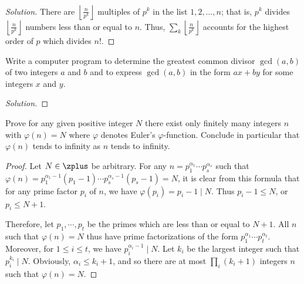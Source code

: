 \begin{proof}[Solution]
	There are $\left\lfloor \frac{n}{p^k} \right\rfloor$ multiples 
	of $p^k$ in the list $1, 2, \dots, n$; that is, $p^k$ divides 
	$\left\lfloor \frac{n}{p^k} \right\rfloor$ numbers less than or 
	equal to $n$. Thus, $\sum_k \left\lfloor \frac{n}{p^k} 
	\right\rfloor$ accounts for the highest order of $p$ which 
	divides $n!$.
\end{proof}


\begin{exercise}
	Write a computer program to determine the greatest common divisor $\gcd(a,b)$ of two integers $a$ and $b$ and to express $\gcd(a,b)$ in the form $ax + by$ for some integers $x$ and $y$.
\end{exercise}

\begin{proof}[Solution]
	
\end{proof}


\begin{exercise}
	Prove for any given positive integer $N$ there exist only finitely many integers $n$ with $\varphi(n) = N$ where $\varphi$ denotes Euler's $\varphi$-function. Conclude in particular that $\varphi(n)$ tends to infinity as $n$ tends to infinity.
\end{exercise}

\begin{proof}
	Let $N \in \zplus$ be arbitrary. For any $n = p_1^{\alpha_1} 
	\cdots p_s^{\alpha_s}$ such that $\varphi(n)  = p_1^{\alpha_1 - 
	1}(p_1 - 1) \cdots p_s^{\alpha_s - 1}(p_s - 1) = N$, it is 
	clear from this formula that for any prime factor $p_i$ of $n$, 
	we have $\varphi(p_i) = p_i - 1 \mid N$. Thus $p_i - 1 \leq N$, 
	or $p_i \leq N + 1$.
	
	Therefore, let $p_1, \cdots, p_t$ be the primes which are less 
	than or equal to $N + 1$. All $n$ such that $\varphi(n) = N$ 
	thus have prime factorizations of the form $p_1^{\alpha_1} 
	\cdots p_t^{\alpha_t}$. Moreover, for $1 \leq i \leq t$, we 
	have $p_i^{\alpha_i - 1} \mid N$. Let $k_i$ be the largest 
	integer such that $p_i^{k_i} \mid N$. Obviously, $\alpha_i \leq 
	k_i + 1$, and so there are at most $\prod_i (k_i + 1)$ integers 
	$n$ such that $\varphi(n) = N$.
\end{proof}

